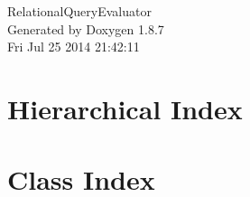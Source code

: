 \documentclass[twoside]{book}
\newcommand{\+}{\discretionary{\mbox{\scriptsize$\hookleftarrow$}}{}{}}
\newcommand{\clearemptydoublepage}{%
  \newpage{\pagestyle{empty}\cleardoublepage}%
}
\begin{document}
\hypersetup{pageanchor=false,
             bookmarks=true,
             bookmarksnumbered=true,
             pdfencoding=unicode
            }
\begin{titlepage}
\vspace*{7cm}
\begin{center}%
{\Large Relational\+Query\+Evaluator }\\
\vspace*{1cm}
{\large Generated by Doxygen 1.8.7}\\
\vspace*{0.5cm}
{\small Fri Jul 25 2014 21:42:11}\\
\end{center}
\end{titlepage}
\clearemptydoublepage
\tableofcontents
\clearemptydoublepage
{}
\hypersetup{pageanchor=true}

\chapter{Hierarchical Index}

\chapter{Class Index}

\end{document}

